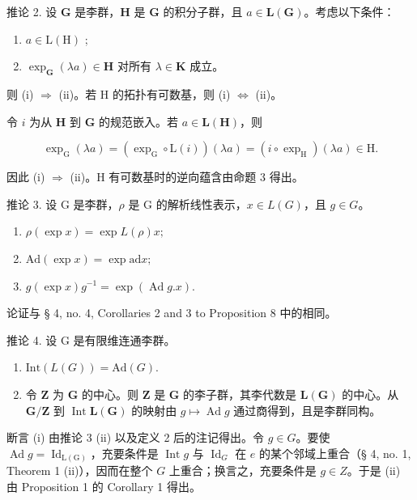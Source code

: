 推论 2. 设 \(\mathbf{G}\) 是李群，\(\mathbf{H}\) 是 \(\mathbf{G}\) 的积分子群，且 \(a \in \mathbf{L}(\mathbf{G})\)。考虑以下条件：

\begin{enumerate}
\def\labelenumi{(\roman{enumi})}
\item
  \(a \in \mathrm{L}(\mathrm{H})\) ;
\item
  \(\exp_{\mathbf{G}}(\lambda a)\in \mathbf{H}\) 对所有 \(\lambda \in \mathbf{K}\) 成立。
\end{enumerate}

则 (i) \(\Rightarrow\) (ii)。若 H 的拓扑有可数基，则 (i) \(\Leftrightarrow\) (ii)。

令 \(i\) 为从 \(\mathbf{H}\) 到 \(\mathbf{G}\) 的规范嵌入。若 \(a \in \mathbf{L}(\mathbf{H})\)，则

\[
\exp_ {\mathrm{G}} (\lambda a) = \left(\exp_ {\mathrm{G}} \circ \mathrm{L} (i)\right) (\lambda a) = (i \circ \exp_ {\mathrm{H}}) (\lambda a) \in \mathrm{H}.
\]

因此 (i) \(\Rightarrow\) (ii)。H 有可数基时的逆向蕴含由命题 3 得出。

推论 3. 设 G 是李群，\(\rho\) 是 G 的解析线性表示，\(x \in L(G)\)，且 \(g \in G\)。

\begin{enumerate}
\def\labelenumi{(\roman{enumi})}
\item
  \(\rho(\exp x) = \exp L(\rho)x;\)
\item
  \(\mathrm{Ad}(\exp x) = \exp \mathrm{ad} x;\)
\item
  \(g(\exp x)g^{-1} = \exp(\operatorname{Ad} g.x).\)
\end{enumerate}

论证与 § 4, no. 4, Corollaries 2 and 3 to Proposition 8 中的相同。

推论 4. 设 G 是有限维连通李群。

\begin{enumerate}
\def\labelenumi{(\roman{enumi})}
\item
  \(\text{Int}(L(G)) = \text{Ad}(G).\)
\item
  令 \(\mathbf{Z}\) 为 \(\mathbf{G}\) 的中心。则 \(\mathbf{Z}\) 是 \(\mathbf{G}\) 的李子群，其李代数是 \(\mathbf{L}(\mathbf{G})\) 的中心。从 \(\mathbf{G} / \mathbf{Z}\) 到 \(\operatorname{Int} \mathbf{L}(\mathbf{G})\) 的映射由 \(g \mapsto \operatorname{Ad} g\) 通过商得到，且是李群同构。
\end{enumerate}

断言 (i) 由推论 3 (ii) 以及定义 2 后的注记得出。令 \(g \in G\)。要使 \(\operatorname{Ad} g = \operatorname{Id}_{\operatorname{L(G)}}\)，充要条件是 \(\operatorname{Int} g\) 与 \(\operatorname{Id}_G\) 在 \(e\) 的某个邻域上重合（§ 4, no. 1, Theorem 1 (ii)），因而在整个 \(G\) 上重合；换言之，充要条件是 \(g \in Z\)。于是 (ii) 由 Proposition 1 的 Corollary 1 得出。

